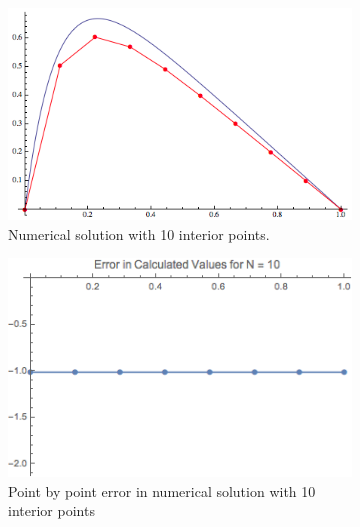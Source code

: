 \documentclass[twocolumn, groupedaddress]{revtex4-1}
\begin{document}
\begin{figure}
	\centering
	\begin{subfigure}{.5\textwidth}
  		\centering
  		\includegraphics[width=.9\linewidth]{solutionN10}
  		\caption{Numerical solution with 10 interior points.}
	\end{subfigure}%
	\begin{subfigure}{.5\textwidth}
  		\centering
  		\includegraphics[width=.9\linewidth]{solutionErrorN10}
  		\caption{Point by point error in numerical solution with 10 interior points}
	\end{subfigure}
	
	\caption{\label{fig:result2}}
\end{figure}
\end{document}
